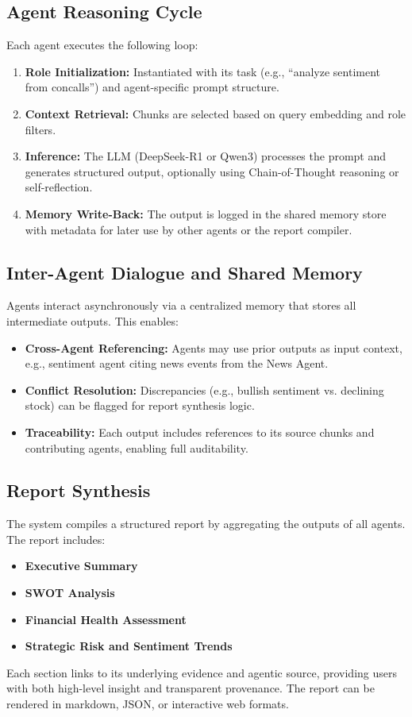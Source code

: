 \documentclass[11pt]{article}
\begin{document}
\subsection*{Agent Reasoning Cycle}
Each agent executes the following loop:
\begin{enumerate}
    \item \textbf{Role Initialization:} Instantiated with its task (e.g., ``analyze sentiment from concalls'') and agent-specific prompt structure.
    \item \textbf{Context Retrieval:} Chunks are selected based on query embedding and role filters.
    \item \textbf{Inference:} The LLM (DeepSeek-R1 or Qwen3) processes the prompt and generates structured output, optionally using Chain-of-Thought reasoning or self-reflection.
    \item \textbf{Memory Write-Back:} The output is logged in the shared memory store with metadata for later use by other agents or the report compiler.
\end{enumerate}

\subsection*{Inter-Agent Dialogue and Shared Memory}
Agents interact asynchronously via a centralized memory that stores all intermediate outputs. This enables:
\begin{itemize}
    \item \textbf{Cross-Agent Referencing:} Agents may use prior outputs as input context, e.g., sentiment agent citing news events from the News Agent.
    \item \textbf{Conflict Resolution:} Discrepancies (e.g., bullish sentiment vs. declining stock) can be flagged for report synthesis logic.
    \item \textbf{Traceability:} Each output includes references to its source chunks and contributing agents, enabling full auditability.
\end{itemize}

\subsection*{Report Synthesis}
The system compiles a structured report by aggregating the outputs of all agents. The report includes:
\begin{itemize}
    \item \textbf{Executive Summary}
    \item \textbf{SWOT Analysis}
    \item \textbf{Financial Health Assessment}
    \item \textbf{Strategic Risk and Sentiment Trends}
\end{itemize}
Each section links to its underlying evidence and agentic source, providing users with both high-level insight and transparent provenance. The report can be rendered in markdown, JSON, or interactive web formats.
\end{document}
